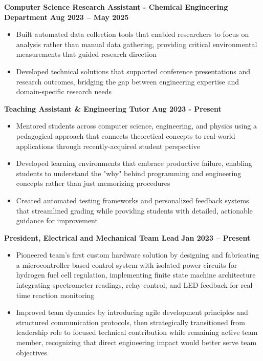 \documentclass{article}
\begin{document}
\textbf{Computer Science Research Assistant - Chemical Engineering Department} \hfill \textbf{Aug 2023 – May 2025}
\begin{itemize}[noitemsep,topsep=2pt]
    \item Built automated data collection tools that enabled researchers to focus on analysis rather than manual data gathering, providing critical environmental measurements that guided research direction
    \item Developed technical solutions that supported conference presentations and research outcomes, bridging the gap between engineering expertise and domain-specific research needs
\end{itemize}

\textbf{Teaching Assistant \& Engineering Tutor} \hfill \textbf{Aug 2023 - Present}
\begin{itemize}[noitemsep,topsep=2pt]
    \item Mentored students across computer science, engineering, and physics using a pedagogical approach that connects theoretical concepts to real-world applications through recently-acquired student perspective
    \item Developed learning environments that embrace productive failure, enabling students to understand the "why" behind programming and engineering concepts rather than just memorizing procedures
    \item Created automated testing frameworks and personalized feedback systems that streamlined grading while providing students with detailed, actionable guidance for improvement
\end{itemize}


 \hfill {}

\textbf{President, Electrical and Mechanical Team Lead} \hfill \textbf{Jan 2023 – Present}
\begin{itemize}[noitemsep,topsep=2pt]
	\item Pioneered team's first custom hardware solution by designing and fabricating a microcontroller-based control system with isolated power circuits for hydrogen fuel cell regulation, implementing finite state machine architecture integrating spectrometer readings, relay control, and LED feedback for real-time reaction monitoring
    \item Improved team dynamics by introducing agile development principles and structured communication protocols, then strategically transitioned from leadership role to focused technical contribution while remaining active team member, recognizing that direct engineering impact would better serve team objectives
\end{itemize}




\end{document}

